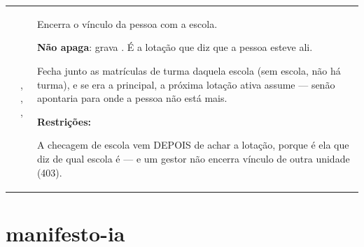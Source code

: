 \begin{tabularx}{\linewidth}{@{}L{40mm}L{24mm}X@{}}
\toprule
\headrow {} &  & \\
\midrule
\endhead
{} & , , ,  & Encerra o vínculo da pessoa com a escola.\par \textbf{Não apaga}: grava . É a lotação que diz que a pessoa esteve ali.\par Fecha junto as matrículas de turma daquela escola (sem escola, não há turma), e se era a principal, a próxima lotação ativa assume --- senão  apontaria para onde a pessoa não está mais.\par \textbf{Restrições:}\par \hspace*{1em}\textbullet{} A checagem de escola vem DEPOIS de achar a lotação, porque é ela que diz de qual escola é --- e um gestor não encerra vínculo de outra unidade (403).\\
\bottomrule
\end{tabularx}

\section{manifesto-ia}

